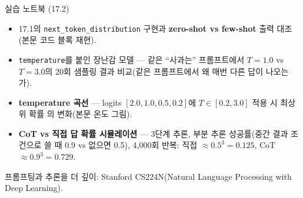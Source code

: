\begin{frame}{실습 노트북 (17.2)}
  \begin{itemize}
    \item 17.1의 \texttt{next\_token\_distribution}
      구현과 \textbf{zero-shot vs few-shot} 출력 대조
      (본문 코드 블록 재현).
    \item \texttt{temperature}를 붙인 장난감 모델 — 같은
      ``사과는'' 프롬프트에서 $T=1.0$ vs $T=3.0$의 20회
      샘플링 결과 비교(같은 프롬프트에서 왜 매번 다른 답이
      나오는가).
    \item \textbf{temperature 곡선} — logits $[2.0, 1.0,
      0.5, 0.2]$에 $T \in [0.2, 3.0]$ 적용 시 최상위 확률
      의 변화(본문 온도 그림).
    \item \textbf{CoT vs 직접 답 확률 시뮬레이션} — 3단계
      추론, 부분 추론 성공률(중간 결과 조건으로 쓸 때 0.9
      vs 없으면 0.5), 4,000회 반복: 직접 $\approx 0.5^3
      = 0.125$, CoT $\approx 0.9^3 = 0.729$.
  \end{itemize}
  {\footnotesize 프롬프팅과 추론을 더 깊이: Stanford
  CS224N(Natural Language Processing with Deep Learning).}
\end{frame}
